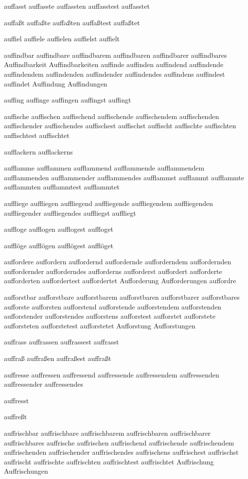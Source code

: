 auffasst auffasste auffassten auffasstest auffasstet

auffaßt auffaßte auffaßten auffaßtest auffaßtet

auffiel auffiele auffielen auffielst auffielt

auffindbar auffindbare auffindbarem auffindbaren auffindbarer auffindbares Auffindbarkeit Auffindbarkeiten auffinde auffinden auffindend auffindende auffindendem auffindenden auffindender auffindendes auffindens auffindest auffindet Auffindung Auffindungen

auffing auffinge auffingen auffingst auffingt

auffische auffischen auffischend auffischende auffischendem auffischenden auffischender auffischendes auffischest auffischst auffischt auffischte auffischten auffischtest auffischtet

aufflackern aufflackerns

aufflamme aufflammen aufflammend aufflammende aufflammendem aufflammenden aufflammender aufflammendes aufflammst aufflammt aufflammte aufflammten aufflammtest aufflammtet

auffliege auffliegen auffliegend auffliegende auffliegendem auffliegenden auffliegender auffliegendes auffliegst auffliegt

auffloge aufflogen aufflogest auffloget

aufflöge aufflögen aufflögest aufflöget

auffordere auffordern auffordernd auffordernde aufforderndem auffordernden auffordernder aufforderndes aufforderns aufforderst auffordert aufforderte aufforderten auffordertest auffordertet Aufforderung Aufforderungen auffordre

aufforstbar aufforstbare aufforstbarem aufforstbaren aufforstbarer aufforstbares aufforste aufforsten aufforstend aufforstende aufforstendem aufforstenden aufforstender aufforstendes aufforstens aufforstest aufforstet aufforstete aufforsteten aufforstetest aufforstetet Aufforstung Aufforstungen

auffrass auffrassen auffrassest auffrasst

auffraß auffraßen auffraßest auffraßt

auffresse auffressen auffressend auffressende auffressendem auffressenden auffressender auffressendes

auffresst

auffreßt

auffrischbar auffrischbare auffrischbarem auffrischbaren auffrischbarer auffrischbares auffrische auffrischen auffrischend auffrischende auffrischendem auffrischenden auffrischender auffrischendes auffrischens auffrischest auffrischst auffrischt auffrischte auffrischten auffrischtest auffrischtet Auffrischung Auffrischungen

